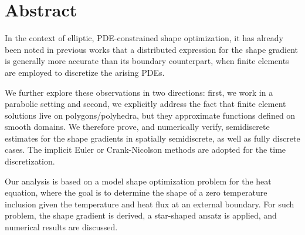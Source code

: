 \documentclass[english,a4paper,10pt,oneside]{scrbook}	%
\theoremstyle{break}
\theoremstyle{remark}
\begin{document}
\newpage

%
%
%



\newpage
\section*{Abstract}
In the context of elliptic, PDE-constrained shape optimization, it has already been noted in previous works that a distributed expression for the shape gradient is generally more accurate than its boundary counterpart, when finite elements are employed to discretize the arising PDEs. 

We further explore these observations in two directions: first, we work in a parabolic setting and second, we explicitly address the fact that finite element solutions live on polygons/polyhedra, but they approximate functions defined on smooth domains. We therefore prove, and numerically verify, semidiscrete estimates for the shape gradients in spatially semidiscrete, as well as fully discrete cases. The implicit Euler or Crank-Nicolson methods are adopted for the time discretization.


Our analysis is based on a model shape optimization problem for the heat equation, where the goal is to determine the shape of a zero temperature inclusion given the temperature and heat flux at an external boundary. For such problem, the shape gradient is derived, a star-shaped ansatz is applied, and numerical results are discussed.
\end{document}
